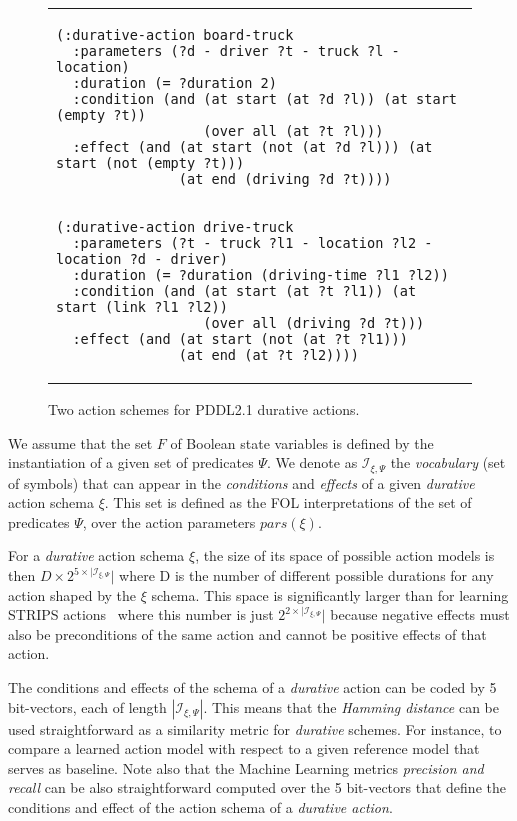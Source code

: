 \documentclass{ecai}
\begin{document}
\begin{figure}
  \begin{tabular}{p{\textwidth}}
\begin{tiny}    
\begin{verbatim}
(:durative-action board-truck
  :parameters (?d - driver ?t - truck ?l - location)
  :duration (= ?duration 2)
  :condition (and (at start (at ?d ?l)) (at start (empty ?t))
                  (over all (at ?t ?l)))
  :effect (and (at start (not (at ?d ?l))) (at start (not (empty ?t)))
               (at end (driving ?d ?t))))


(:durative-action drive-truck
  :parameters (?t - truck ?l1 - location ?l2 - location ?d - driver)
  :duration (= ?duration (driving-time ?l1 ?l2))
  :condition (and (at start (at ?t ?l1)) (at start (link ?l1 ?l2))
                  (over all (driving ?d ?t)))
  :effect (and (at start (not (at ?t ?l1))) 
               (at end (at ?t ?l2))))
\end{verbatim}
\end{tiny}    
\end{tabular}
\caption{\small Two action schemes for PDDL2.1 durative actions.}
\label{fig:exampleactions2}
\end{figure}

We assume that the set $F$ of Boolean state variables is defined by the instantiation of a given set of predicates $\Psi$. We denote as ${\mathcal I}_{\xi,\Psi}$ the {\em vocabulary} (set of symbols) that can appear in the {\em conditions} and {\em effects} of a given {\em durative} action schema $\xi$. This set is defined as the FOL interpretations of the set of predicates $\Psi$, over the action parameters $pars(\xi)$.

For a {\em durative} action schema $\xi$, the size of its space of possible action models is then $D\times 2^{5\times|{\mathcal I}_{\xi,\Psi}}|$ where D is the number of different possible durations for any action shaped by the $\xi$ schema. This space is significantly larger than for learning STRIPS actions~\cite{yang2007learning} where this number is just $2^{2\times|{\mathcal I}_{\xi,\Psi}}|$ because negative effects must also be preconditions of the same action and cannot be positive effects of that action.

The conditions and effects of the schema of a {\em durative} action can be coded by 5 bit-vectors, each of length $|{\mathcal I}_{\xi,\Psi}|$. This means that the {\em Hamming distance} can be used straightforward as a similarity metric for {\em durative} schemes. For instance, to compare a learned action model with respect to a given reference model that serves as baseline. Note also that the Machine Learning metrics {\em precision and recall} can be also straightforward computed over the 5 bit-vectors that define the conditions and effect of the action schema of a {\em durative action}.
\end{document}
